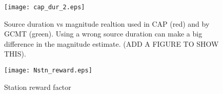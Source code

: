 \documentclass[11pt,titlepage,fleqn]{article}
\begin{document}
\clearpage\pagebreak



\clearpage\pagebreak
\appendix





\begin{figure}
\texttt{[image: cap\_dur\_2.eps]}
\caption{Source duration vs magnitude realtion used in CAP (red) and by GCMT (green). Using a wrong source duration can make a big difference in the magnitude estimate. (ADD A FIGURE TO SHOW THIS).
\label{fig:cap_dur}
}
\end{figure}

\begin{figure}
\texttt{[image: Nstn\_reward.eps]}
\caption{Station reward factor}
\label{fig:Nstn_reward}
\end{figure}
\end{document}
